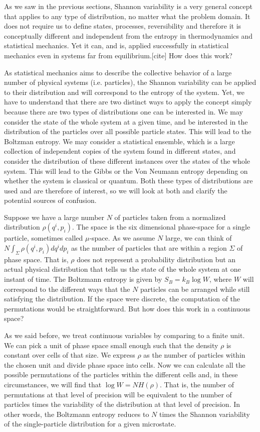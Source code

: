 \documentclass{article}
\begin{document}
As we saw in the previous sections, Shannon variability is a very general concept that applies to any type of distribution, no matter what the problem domain. It does not require us to define states, processes, reversibility and therefore it is conceptually different and independent from the entropy in thermodynamics and statistical mechanics. Yet it can, and is, applied successfully in statistical mechanics even in systems far from equilibrium.[cite] How does this work?

As statistical mechanics aims to describe the collective behavior of a large number of physical systems (i.e. particles), the Shannon variability can be applied to their distribution and will correspond to the entropy of the system. Yet, we have to understand that there are two distinct ways to apply the concept simply because there are two types of distributions one can be interested in. We may consider the state of the whole system at a given time, and be interested in the distribution of the particles over all possible particle states. This will lead to the Boltzman entropy. We may consider a statistical ensemble, which is a large collection of independent copies of the system found in different states, and consider the distribution of these different instances over the states of the whole system. This will lead to the Gibbs or the Von Neumann entropy depending on whether the system is classical or quantum. Both these types of distributions are used and are therefore of interest, so we will look at both and clarify the potential sources of confusion.

Suppose we have a large number $N$ of particles taken from a normalized distribution $\rho(q^i, p_i)$. The space is the six dimensional phase-space for a single particle, sometimes called $\mu$-space. As we assume $N$ large, we can think of $N\int_\Sigma \rho(q^i, p_i)dq^idp_i$ as the number of particles that are within a region $\Sigma$ of phase space. That is, $\rho$ does not represent a probability distribution but an actual physical distribution that tells us the state of the whole system at one instant of time. The Boltzmann entropy is given by $S_B = k_B \log W$, where $W$ will correspond to the different ways that the $N$ particles can be arranged while still satisfying the distribution. If the space were discrete, the computation of the permutations would be straightforward. But how does this work in a continuous space?

As we said before, we treat continuous variables by comparing to a finite unit. We can pick a unit of phase space small enough such that the density $\rho$ is constant over cells of that size. We express $\rho$ as the number of particles within the chosen unit and divide phase space into cells. Now we can calculate all the possible permutations of the particles within the different cells and, in these circumstances, we will find that $\log W = N H(\rho)$. That is, the number of permutations at that level of precision will be equivalent to the number of particles times the variability of the distribution at that level of precision. In other words, the Boltzmann entropy reduces to $N$ times the Shannon variability of the single-particle distribution for a given microstate.
\end{document}

